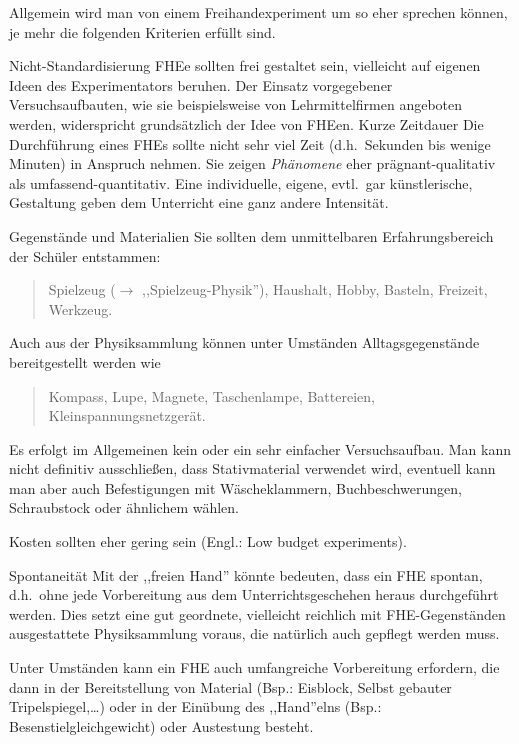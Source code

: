 Allgemein wird man von einem Freihandexperiment um so eher sprechen
k\"{o}nnen, je mehr die folgenden Kriterien erf\"{u}llt sind.
\begin{itemize}
	\bitem
	{Nicht-Standardisierung}
	FHEe sollten frei gestaltet sein, vielleicht auf eigenen Ideen
	des Experimentators beruhen.
	Der Einsatz vorgegebener Versuchsaufbauten, wie sie
	beispielsweise von Lehrmittelfirmen angeboten werden,
	widerspricht grunds\"{a}tzlich der Idee von FHEen.
	\bitem
	{Kurze Zeitdauer}
	Die Durchf\"{u}hrung eines FHEs sollte nicht sehr viel Zeit
	(d.h.\ Sekunden bis wenige Minuten) in Anspruch nehmen.
	Sie zeigen {\it Ph\"{a}nomene} eher pr\"{a}gnant-qualitativ als
	umfassend-quantitativ.
	\mip
	Eine individuelle, eigene, evtl.\ gar k\"{u}nstlerische, Gestaltung
	geben dem Unterricht eine ganz andere Intensit\"{a}t.
	
	\bitem
	{Gegenst\"{a}nde und Materialien}
	Sie sollten dem unmittelbaren Erfahrungsbereich der
	Sch\"{u}ler entstammen:
	\begin{quote}
		Spielzeug ($\to$ ,,Spielzeug-Physik''), Haushalt, Hobby,
		Basteln, Freizeit, Werkzeug.
	\end{quote}
	Auch aus der Physiksammlung k\"{o}nnen unter Umst\"{a}nden
	Alltagsgegenst\"{a}nde bereitgestellt werden wie
	\begin{quote}
		Kompass, Lupe, Magnete, Taschenlampe, Battereien, Kleinspannungsnetzger\"{a}t.
	\end{quote}
	
	\mip
	Es erfolgt im Allgemeinen kein oder ein sehr
	einfacher Versuchsaufbau.
	Man kann nicht definitiv ausschlie{\ss}en, dass
	Stativmaterial verwendet wird, eventuell kann man
	aber auch Befestigungen mit W\"{a}scheklammern,
	Buchbeschwerungen, Schraubstock oder \"{a}hnlichem w\"{a}hlen.
	
	\mip
	Kosten sollten eher gering sein (Engl.: Low budget experiments).
	
	\bitem
	{Spontaneit\"{a}t} Mit der ,,freien Hand'' k\"{o}nnte bedeuten,
	dass ein FHE spontan, d.h.\ ohne jede Vorbereitung aus dem
	Unterrichtsgeschehen heraus durchgef\"{u}hrt werden.
	Dies setzt eine gut geordnete, vielleicht reichlich mit
	FHE-Gegenst\"{a}nden ausgestattete Physiksammlung voraus,
	die nat\"{u}rlich auch gepflegt werden muss.
	
	\mip
	Unter Umst\"{a}nden kann ein FHE auch umfangreiche Vorbereitung
	erfordern, die dann in der Bereitstellung von
	Material
	(Bsp.: Eisblock, Selbst gebauter Tripelspiegel,\dots)
	oder in der Ein\"{u}bung des ,,Hand''elns
	(Bsp.: Besenstielgleichgewicht) oder Austestung besteht.
	

\end{itemize}
